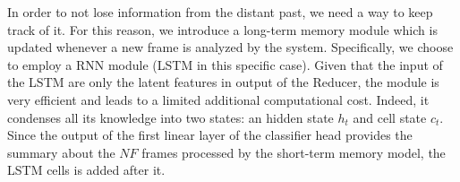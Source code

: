 In order to not lose information from the distant past, we need a way to keep track of it.
For this reason, we introduce a long-term memory module  which is updated whenever a new frame is analyzed by the system.
Specifically, we choose to employ a RNN module (LSTM \cite{lstm} in this specific case).
Given that the input of the LSTM  are only the latent features in output of the Reducer, the module is very efficient and leads to a limited additional computational cost.
Indeed, it condenses all its knowledge into two states: an hidden state $h_t$ and cell state $c_t$.
Since the output of the first linear layer of the classifier head provides the summary about the $NF$ frames processed by the short-term memory model, the LSTM cells is added after it.

